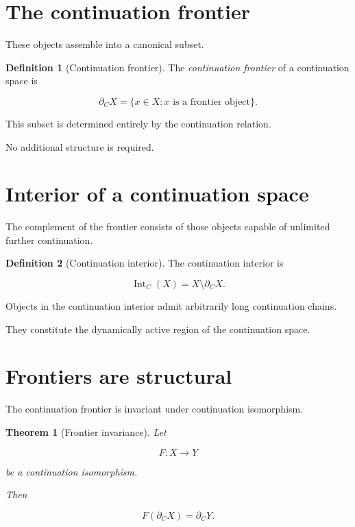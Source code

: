 \documentclass[13pt,openany]{book}
\theoremstyle{plain}
\newtheorem{theorem}{Theorem}[chapter]
\theoremstyle{definition}
\newtheorem{definition}{Definition}[chapter]
\begin{document}
\section{The continuation frontier}

These objects assemble into a canonical subset.

\begin{definition}[Continuation frontier]
The \emph{continuation frontier} of a continuation space is

\[
\partial_C X
=
\{
x\in X:
x
\text{ is a frontier object}
\}.
\]

\end{definition}

This subset is determined entirely by the continuation relation.

No additional structure is required.


\section{Interior of a continuation space}

The complement of the frontier consists of those objects capable of unlimited
further continuation.

\begin{definition}[Continuation interior]
The continuation interior is

\[
\operatorname{Int}_C(X)
=
X\setminus\partial_C X.
\]

\end{definition}

Objects in the continuation interior admit arbitrarily long continuation
chains.

They constitute the dynamically active region of the continuation space.


\section{Frontiers are structural}

The continuation frontier is invariant under continuation isomorphism.

\begin{theorem}[Frontier invariance]
Let

\[
F:X\rightarrow Y
\]

be a continuation isomorphism.

Then

\[
F(\partial_C X)
=
\partial_C Y.
\]

\end{theorem}
\end{document}
